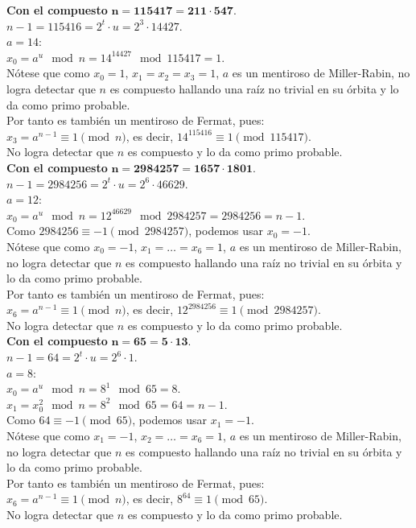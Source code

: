 \begin{ejemplo} 
\textbf{Con el compuesto} $\boldsymbol{n=115417=211 \cdot 547}$. \\
$n-1 = 115416 = 2^t \cdot u = 2^3 \cdot 14427$. \\
$a=14$: \\
$x_0 = a^{u} \mod n =14^{14427} \mod 115417 = 1$. \\
Nótese que como $x_0=1$, $x_1 = x_2 = x_3 = 1$, $a$ es un mentiroso de Miller-Rabin, no logra detectar que $n$ es compuesto hallando una raíz no trivial en su órbita y lo da como primo probable. \\
Por tanto es también un mentiroso de Fermat, pues: \\
$x_3 = a^{n-1} \equiv 1 \pmod n$, es decir, $14^{115416} \equiv 1 \pmod {115417}$. \\
No logra detectar que $n$ es compuesto y lo da como primo probable. \\
\textbf{Con el compuesto} $\boldsymbol{n=2984257=1657 \cdot 1801}$. \\
$n-1 = 2984256 = 2^t \cdot u = 2^6 \cdot 46629$. \\
$a=12$: \\
$x_0 = a^{u} \mod n =12^{46629} \mod 2984257 = 2984256 = n-1$. \\
Como $2984256 \equiv -1 \pmod {2984257}$, podemos usar $x_0=-1$. \\
Nótese que como $x_0=-1$, $x_1 = \dots = x_6 = 1$, $a$ es un mentiroso de Miller-Rabin, no logra detectar que $n$ es compuesto hallando una raíz no trivial en su órbita y lo da como primo probable. \\
Por tanto es también un mentiroso de Fermat, pues: \\
$x_6 = a^{n-1} \equiv 1 \pmod n$, es decir, $12^{2984256} \equiv 1 \pmod {2984257}$. \\
No logra detectar que $n$ es compuesto y lo da como primo probable. \\
\textbf{Con el compuesto} $\boldsymbol{n=65=5 \cdot 13}$. \\
$n-1 = 64 = 2^t \cdot u = 2^6 \cdot 1$. \\
$a=8$: \\
$x_0 = a^{u} \mod n =8^{1} \mod 65 = 8$. \\
$x_1 = x_0^{2} \mod n =8^{2} \mod 65 = 64 = n-1$. \\
Como $64 \equiv -1 \pmod {65}$, podemos usar $x_1=-1$. \\
Nótese que como $x_1=-1$, $x_2= \dots = x_6 = 1$, $a$ es un mentiroso de Miller-Rabin, no logra detectar que $n$ es compuesto hallando una raíz no trivial en su órbita y lo da como primo probable. \\
Por tanto es también un mentiroso de Fermat, pues: \\
$x_6 = a^{n-1} \equiv 1 \pmod n$, es decir, $8^{64} \equiv 1 \pmod {65}$. \\
No logra detectar que $n$ es compuesto y lo da como primo probable.
\end{ejemplo}

